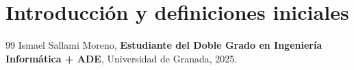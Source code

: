 \documentclass[a4paper,12pt]{book}
\begin{document}
\chapter{Introducción y definiciones iniciales}





\newpage
\begin{thebibliography}{99}
Ismael Sallami Moreno, \textbf{Estudiante del Doble Grado en Ingeniería Informática + ADE}, Universidad de Granada, 2025.

\end{thebibliography}
\end{document}
